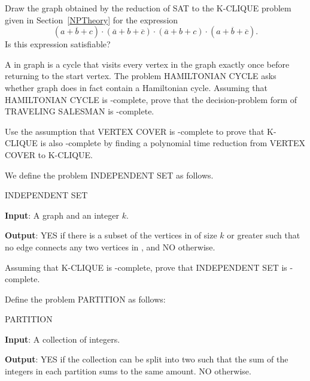 \begin{exercises}
\item
Draw the graph obtained by the reduction of SAT to the K-CLIQUE problem
given in Section~\ref{NPTheory} for the expression
\[(a + \overline{b} + c) \cdot (\overline{a} + b + \overline{c})
\cdot (\overline{a} + b + c) \cdot (a + \overline{b} + \overline{c}).\]
\noindent Is this expression satisfiable?

\item
A  in graph  is a cycle that visits
every vertex in the graph exactly once before returning to the start
vertex.
The problem HAMILTONIAN CYCLE asks whether graph  does in fact
contain a Hamiltonian cycle.
Assuming that HAMILTONIAN CYCLE is \NP-complete, prove that
the decision-problem form of TRAVELING SALESMAN is
\NP-complete.

\item
Use the assumption that VERTEX COVER is \NP-complete to prove that
K-CLIQUE is also \NP-complete by finding a polynomial time reduction
from VERTEX COVER to K-CLIQUE.

\item
We define the problem INDEPENDENT SET as
follows.

\begin{inboxex}
\noindent INDEPENDENT SET

\textbf{Input}: A graph  and an integer \(k\).

\textbf{Output}: YES if there is a subset  of the vertices in
 of size \(k\) or greater such that no edge connects any two
vertices in , and NO otherwise.
\end{inboxex}

Assuming that K-CLIQUE is \NP-complete, prove that INDEPENDENT SET is
\NP-complete.

\item
Define the problem PARTITION as follows:

\begin{inboxex}
\noindent PARTITION

\textbf{Input}: A collection of integers.

\textbf{Output}: YES if the collection can be split into two such that
the sum of the integers in each partition sums to the same amount.
NO otherwise.
\end{inboxex}


\end{exercises}
